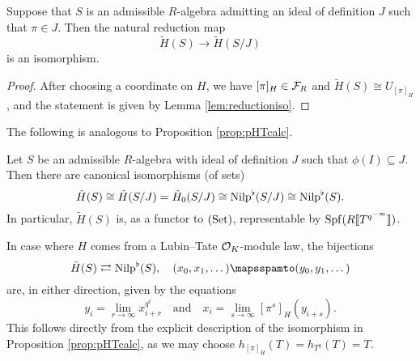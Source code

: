 \begin{lem}
  Suppose that $S$ is an admissible $R$-algebra admitting an ideal of definition
  $J$ such that $\pi \in J$. Then the natural reduction map
  \begin{equation*}
    \tilde H(S) \to \tilde H(S/J)
  \end{equation*}
  is an isomorphism.
  \begin{proof}[Proof]
    After choosing a coordinate on $H$, we have $[\pi]_H \in \mathcal{F}_R$ and 
    $\tilde H(S) \cong U_{[\pi]_H}$, and the statement is given by 
    Lemma \ref{lem:reductioniso}.
  \end{proof}
\end{lem}

The following is analogous to Proposition \ref{prop:pHTcalc}.
\begin{prop}
  Let $S$ be an admissible $R$-algebra with ideal of definition $J$ such that 
  $\phi(I) \subseteq J$. Then there are canonical isomorphisms (of sets)
      \begin{equation*}
        \tilde H(S) \cong \tilde H(S/J) = \tilde H_0(S/J) \cong {\mathrm{Nilp}}^\flat(S/J) \cong
        {\mathrm{Nilp}}^\flat(S).
      \end{equation*}
  In particular, $\tilde H(S)$ is, as a functor to ${(\mathrm{Set})}$, representable by
  $\operatorname{Spf}(R \llbracket T^{q^{-\infty}} \rrbracket)$.
\end{prop}

\begin{rmk} 
  In case where $H$ comes from a Lubin--Tate $\mathcal{O}_K$-module law, the bijections
  \begin{equation*}
    \tilde H(S) \rightleftarrows \Nilp^\flat(S), \quad (x_0, x_1, \dots) \mapsspamto (y_0, y_1, \dots)
  \end{equation*}
  are, in either direction, given by the equations
  \begin{equation*}
    y_i = \lim_{r \to \infty} x_{i+r}^{q^r} \quad \text{and} \quad 
    x_i = \lim_{s \to \infty} [\pi^s]_H(y_{i+s}).
  \end{equation*}
  This follows directly from the explicit description of the isomorphism in
  Proposition \ref{prop:pHTcalc}, as we may choose $h_{[\pi]_H}(T) = h_{T^q}(T)
  = T$.
\end{rmk}



